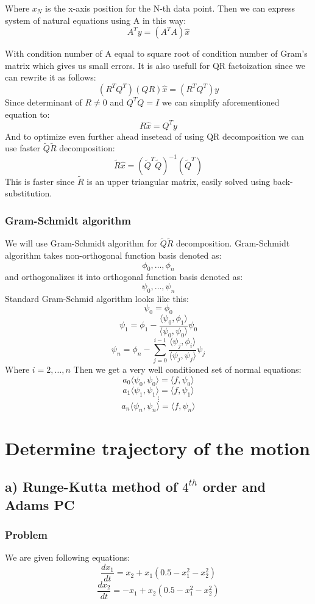 \documentclass[12pt]{report}
\begin{document}
Where $x_N$ is the x-axis position for the N-th data point. Then we can express system of natural equations using A in this way:
\[ A^Ty = (A^TA)\hat{x} \]

With condition number of A equal to square root of condition number of Gram's matrix which gives us small errors. It is also usefull for QR factoization since we can rewrite it as follows:
\[ (R^TQ^T)(QR)\hat{x} = (R^TQ^T)y \]
Since determinant of $R \neq 0$ and $Q^TQ = I$ we can simplify aforementioned equation to:
\[ R\hat{x} = Q^Ty \]
And to optimize even further ahead insetead of using QR decomposition we can use faster $\tilde{Q}\tilde{R}$ decomposition:
\[ \tilde{R}\hat{x} = (\tilde{Q}^T\tilde{Q})^{-1}(\tilde{Q}^T) \]
This is faster since $\tilde{R}$ is an upper triangular matrix, easily solved using back-substitution.

\subsection{Gram-Schmidt algorithm}
We will use Gram-Schmidt algorithm for $\tilde{Q}\tilde{R}$ decomposition.
Gram-Schmidt algorithm takes non-orthogonal function basis denoted as:
\[ \phi_0, \dots, \phi_n \]
and orthogonalizes it into orthogonal function basis denoted as:
\[ \psi_0, \dots, \psi_n \]
Standard Gram-Schmid algorithm looks like this:
\[ \psi_0 = \phi_0 \]
\[ \psi_1 = \phi_1 - \frac{\langle \psi_0, \phi_1 \rangle}{\langle \psi_0, \psi_0 \rangle} \psi_0 \]
\[ \psi_n = \phi_n - \sum_{j = 0}^{i-1}  \frac{\langle \psi_j, \phi_i \rangle}{\langle \psi_j, \psi_j \rangle} \psi_j \]
Where $ i = 2, \dots, n $
Then we get a very well conditioned set of normal equations:
\[ a_0\langle \psi_0, \psi_0 \rangle = \langle f, \psi_0 \rangle \]
\[ a_1\langle \psi_1, \psi_1 \rangle = \langle f, \psi_1 \rangle \]
\[ \vdots \]
\[ a_n\langle \psi_n, \psi_n \rangle = \langle f, \psi_n \rangle \]




\chapter{Determine trajectory of the motion}


\section{a) Runge-Kutta method of $4^{th}$ order and Adams PC}
\subsection{Problem}
We are given following equations:
\[ \frac{dx_1}{dt} = x_2 + x_1(0.5 - x_1^2 - x_2^2) \]
\[ \frac{dx_2}{dt} = -x_1 + x_2(0.5 - x_1^2 - x_2^2) \]
\end{document}
